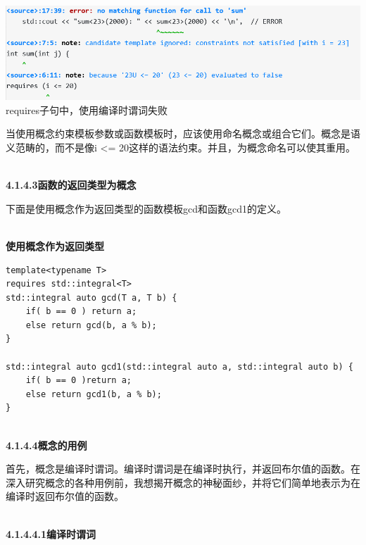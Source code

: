 \begin{center}
\includegraphics[width=1.0\textwidth]{content/3/chapter4/images/1-2.png}\\
requires子句中，使用编译时谓词失败
\end{center}

\begin{tcolorbox}[breakable,enhanced jigsaw,colback=blue!5!white,colframe=blue!75!black,title={避免在requires子句中使用编译时谓词}]
当使用概念约束模板参数或函数模板时，应该使用命名概念或组合它们。概念是语义范畴的，而不是像i <= 20这样的语法约束。并且，为概念命名可以使其重用。
\end{tcolorbox}

\hspace*{\fill} \\ %
\noindent
\textbf{4.1.4.3\hspace{0.2cm}函数的返回类型为概念}

下面是使用概念作为返回类型的函数模板gcd和函数gcd1的定义。

\hspace*{\fill} \\ %
\noindent
\textbf{使用概念作为返回类型}
\begin{lstlisting}[style=styleCXX]
template<typename T>
requires std::integral<T>
std::integral auto gcd(T a, T b) {
	if( b == 0 ) return a;
	else return gcd(b, a % b);
}

std::integral auto gcd1(std::integral auto a, std::integral auto b) {
	if( b == 0 )return a;
	else return gcd1(b, a % b);
}
\end{lstlisting}

\hspace*{\fill} \\ %
\noindent
\textbf{4.1.4.4\hspace{0.2cm}概念的用例}

首先，概念是编译时谓词。编译时谓词是在编译时执行，并返回布尔值的函数。在深入研究概念的各种用例前，我想揭开概念的神秘面纱，并将它们简单地表示为在编译时返回布尔值的函数。

\hspace*{\fill} \\ %
\noindent
\textbf{4.1.4.4.1\hspace{0.2cm}编译时谓词}

